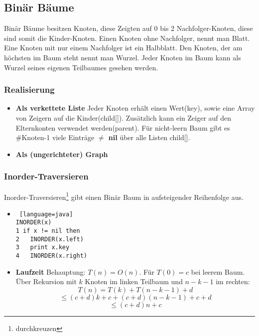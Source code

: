 \documentclass[jou,apacite]{apa6}
\begin{document}
\subsection{Binär Bäume}

Binär Bäume besitzen Knoten, diese Zeigten auf 0 bis 2 Nachfolger-Knoten, diese sind somit die Kinder-Knoten. Einen Knoten ohne Nachfolger, nennt man Blatt. Eine Knoten mit nur einem Nachfolger ist ein Halbblatt. Den Knoten, der am höchsten im Baum steht nennt man Wurzel. Jeder Knoten im Baum kann als Wurzel seines eigenen Teilbaumes gesehen werden. 

\subsubsection{Realisierung}
\begin{itemize}
    \item {\bfseries Als verkettete Liste} Jeder Knoten erhält einen Wert(key), sowie eine Array von Zeigern auf die Kinder(child[]). Zusätzlich kann ein Zeiger auf den Elternkonten verwendet werden(parent). Für nicht-leern Baum gibt es \#Knoten-1 viele Einträge {\bfseries $\neq$ nil} über alle Listen child[].
    \item {\bfseries Als (ungerichteter) Graph}
\end{itemize}

\subsubsection{Inorder-Traversieren}
Inorder-Traversieren\footnote{durchkreuzen} gibt einen Binär Baum in aufsteigender Reihenfolge aus.
\begin{itemize}
    \item 
    \begin{lstlisting} [language=java]
INORDER(x)
1 if x != nil then
2   INORDER(x.left)
3   print x.key
4   INORDER(x.right)
\end{lstlisting}
\item {\bfseries Laufzeit} Behauptung: $T(n)=O(n)$. Für $T(0)=c$ bei leerem Baum. Über Rekursion mit $k$ Knoten im linken Teilbaum und $n-k-1$ im rechten: \[T(n)=T(k) + T (n-k-1) + d \]\[ \leq (c+d)k+c+(c+d)(n-k-1)+c+d \]\[ \leq (c+d)n+c\]
\end{itemize}
\end{document}
